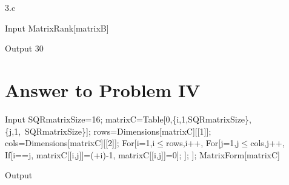 \documentclass[11pt,a4paper]{article}
\begin{document}
3.c

\begin{mmaCell}[moredefined={matrixB}]{Input}
MatrixRank[matrixB]
\end{mmaCell}

\begin{mmaCell}{Output}
30
\end{mmaCell}

\clearpage
\section{Answer to Problem IV}\label{sec:P04}

\begin{mmaCell}[moredefined={SQRmatrixSize, matrixC, i, j, rows, cols}]{Input}
SQRmatrixSize=16;
matrixC=Table[0,\{i,1,SQRmatrixSize\},\{j,1,\
SQRmatrixSize\}];
rows=Dimensions[matrixC][[1]];
cols=Dimensions[matrixC][[2]];
For[i=1,i\(\pmb{\leq}\)rows,i++,
  For[j=1,j\(\pmb{\leq}\)cols,j++,
    If[i==j,
      matrixC[[i,j]]=(\mmaDef{\(\pmb{\pi}\)}+i)-1,
      matrixC[[i,j]]=0];
  ];
];
MatrixForm[matrixC]
\end{mmaCell}

\begin{mmaCell}{Output}

\end{mmaCell}
\end{document}

